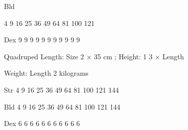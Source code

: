 \documentclass[twoside]{book}
\begin{document}
                  
                   Bld   
                  
                    
                    
                   4   
                   9   
                   16   
                   25   
                   36   
                   49   
                   64   
                   81   
                   100   
                   121   
                  
                  
                   Dex   
                   9   
                   9   
                   9   
                   9   
                   9   
                   9   
                   9   
                   9   
                   9   
                   9   
                   9   
                  
                  
                   Quadruped   
                    Length:   
                         Size  2 
                             ×    35 
                           cm    ; Height:  
                            1  3   
                           ×    Length   
                    
                  
                  
                    
                      Weight:     
                     Length  2    kilograms
                         
                    
                  
                  
                   Str   
                   4   
                   9   
                   16   
                   25   
                   36   
                   49   
                   64   
                   81   
                   100   
                   121   
                   144   
                  
                  
                   Bld   
                   4   
                   9   
                   16   
                   25   
                   36   
                   49   
                   64   
                   81   
                   100   
                   121   
                   144   
                  
                  
                   Dex   
                   6   
                   6   
                   6   
                   6   
                   6   
                   6   
                   6   
                   6   
                   6   
                   6   
                   6   
                  
\end{document}
